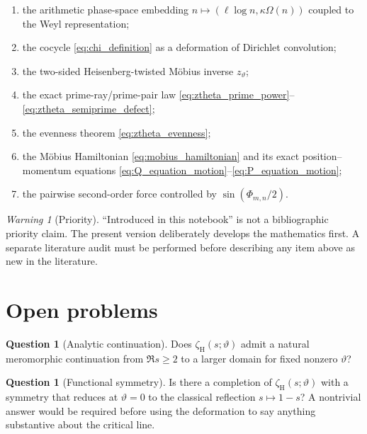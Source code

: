 \documentclass[11pt]{amsart}
\numberwithin{equation}{section}
\theoremstyle{plain}
\theoremstyle{definition}
\newtheorem{question}[theorem]{Question}
\theoremstyle{remark}
\newtheorem{warning}[theorem]{Warning}
\newcommand{\Om}{\Omega}
\begin{document}
\begin{enumerate}[leftmargin=*]
\item the arithmetic phase-space embedding
$n\mapsto(\ell\log n,\kappa\Om(n))$ coupled to the Weyl representation;
\item the cocycle \eqref{eq:chi_definition} as a deformation of Dirichlet
convolution;
\item the two-sided Heisenberg-twisted M\"obius inverse
$z_{\vartheta}$;
\item the exact prime-ray/prime-pair law
\eqref{eq:ztheta_prime_power}--\eqref{eq:ztheta_semiprime_defect};
\item the evenness theorem \eqref{eq:ztheta_evenness};
\item the M\"obius Hamiltonian \eqref{eq:mobius_hamiltonian} and its exact
position--momentum equations
\eqref{eq:Q_equation_motion}--\eqref{eq:P_equation_motion};
\item the pairwise second-order force controlled by
$\sin(\Phi_{m,n}/2)$.
\end{enumerate}

\begin{warning}[Priority]
\label{warn:priority}
``Introduced in this notebook'' is not a bibliographic priority claim.  The
present version deliberately develops the mathematics first.  A separate
literature audit must be performed before describing any item above as new in
the literature.
\end{warning}

\section{Open problems}
\label{sec:open_problems}

\begin{question}[Analytic continuation]
\label{q:analytic_continuation}
Does $\zeta_{\mathrm H}(s;\vartheta)$ admit a natural meromorphic continuation
from $\Re s\ge2$ to a larger domain for fixed nonzero $\vartheta$?
\end{question}

\begin{question}[Functional symmetry]
\label{q:functional_symmetry}
Is there a completion of $\zeta_{\mathrm H}(s;\vartheta)$ with a symmetry
that reduces at $\vartheta=0$ to the classical reflection $s\mapsto1-s$?
A nontrivial answer would be required before using the deformation to say
anything substantive about the critical line.
\end{question}
\end{document}
